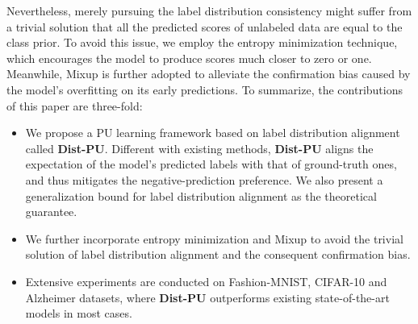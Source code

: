 \documentclass[final]{cvpr}
\newcommand{\bangyan}[1]{#1}
\newcommand{\yunrui}[1]{#1}
\begin{document}
\bangyan{Nevertheless, merely pursuing the label distribution consistency might suffer from} \yunrui{a trivial solution that all the predicted scores of unlabeled data are equal to the class prior.} To avoid this issue, we employ the entropy minimization technique, which encourages the model to produce scores much closer to zero or one. Meanwhile, Mixup \cite{DBLP:conf/iclr/ZhangCDL18} is further adopted to alleviate the confirmation bias caused by the model's overfitting on its early predictions. To summarize, the contributions of this paper are three-fold:
\begin{itemize}[leftmargin=*]
    \setlength{\itemsep}{0pt}
    \setlength{\parsep}{0pt}
    \setlength{\parskip}{0pt}
    \item We propose a PU learning framework based on label distribution alignment called \textbf{Dist-PU}. Different with existing methods, \textbf{Dist-PU} aligns the expectation of the model's predicted labels with that of ground-truth ones, and thus mitigates the negative-prediction preference. We also present a generalization bound for label distribution alignment as the theoretical guarantee.
    \item We further incorporate entropy minimization and Mixup to avoid the trivial solution of label distribution alignment and the consequent confirmation bias.
    \item Extensive experiments are conducted on Fashion-MNIST, CIFAR-10 and Alzheimer datasets, where \textbf{Dist-PU} outperforms existing state-of-the-art models in most cases.
\end{itemize}

\end{document}
